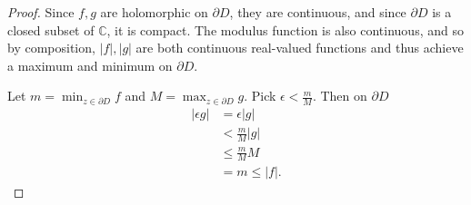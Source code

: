 \documentclass{article}
\begin{document}
\begin{enumerate}
\begin{proof}
		Since $f,g$ are holomorphic on $\partial D$, they are continuous, and since $\partial D$ is a closed subset of $\mathbb{C}$, it is compact.
		The modulus function is also continuous, and so by composition,		
		$|f|,|g|$ are both continuous real-valued functions and thus achieve a maximum and minimum on $\partial D$.
		
		Let $m = \min_{z \in \partial D} f$ and $M = \max_{z \in \partial D} g$. Pick $\epsilon < \frac{m}{M}$. Then on $\partial D$ 
		\begin{align*}
			| \epsilon g | &= \epsilon |g|\\
			& < \frac{m}{M} |g|\\
			& \leq \frac{m}{M}M\\
			&= m \leq |f|.
		\end{align*}
	\end{proof}
	

\end{enumerate}
\end{document}
